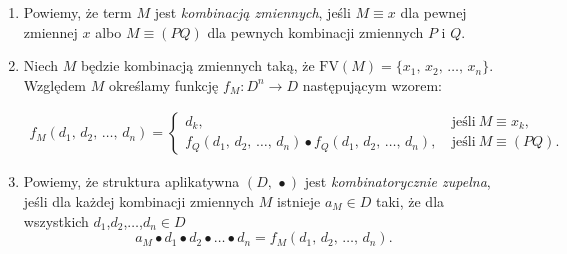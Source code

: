 \begin{definicja}%
\begin{enumerate}
  \setlength\itemsep{0em}
\item
Powiemy, że term \(M\) jest \emph{kombinacją zmiennych}, jeśli \(M\equiv x\) dla pewnej zmiennej \(x\) albo \(M\equiv (PQ)\) dla pewnych kombinacji zmiennych \(P\) i \(Q\). 
\item 
Niech \(M\) będzie kombinacją zmiennych taką, że \(\mathrm{FV}(M)=\{x_1,\,x_2,\,\dots,\,x_n\}\). Względem \(M\) określamy funkcję \(f_M: D^n\to D\) następującym wzorem:

\begin{align*}
f_M (d_1,\,d_2,\,\dots,\,d_n) = \begin{cases}
d_k,\ &\text{jeśli}\ M\equiv x_k, \\
f_Q (d_1,\,d_2,\,\dots,\,d_n) \bullet f_Q (d_1,\,d_2,\,\dots,\,d_n),\ & \text{jeśli}\ M\equiv (PQ).
\end{cases}
\end{align*}

\item
Powiemy, że struktura aplikatywna \((D,\,\bullet)\) jest \emph{kombinatorycznie zupelna}, jeśli dla każdej kombinacji zmiennych \(M\) istnieje \(a_M\in D\) taki, że dla wszystkich \(d_1\),\(d_2\),\(\dots\),\(d_n\in D\)
\[
  a_M\bullet d_1 \bullet d_2 \bullet \dots \bullet d_n = f_M(d_1,\, d_2,\,\dots,\,d_n).
\]
\end{enumerate}
\end{definicja}


